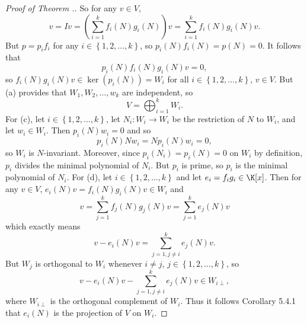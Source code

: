 \documentclass[linearalgebraII]{subfiles}
\begin{document}
\begin{proof}[Proof of Theorem \thechapter.\thestcounter]
        So for any $v\in V$,
        \begin{equation*}
            v = Iv = \left( \sum^{k}_{i=1} f_i(N)g_i(N) \right) v = \sum^{k}_{i=1} f_i(N)g_i(N)v.
        \end{equation*}
        But $p = p_if_i$ for any $i\in\left\lbrace 1,2,\ldots,k \right\rbrace$, so $p_i(N)f_i(N) = p(N) = 0$. It follows that
        \begin{equation*}
            p_i(N)f_i(N)g_i(N)v = 0,
        \end{equation*}
        so $f_i(N)g_i(N)v\in\ker\left( p_i(N) \right) = W_i$ for all $i\in\left\lbrace 1,2,\ldots,k \right\rbrace$, $v\in V$. But (a) provides that $W_1,W_2,\ldots,w_k$ are independent, so
        \begin{equation*}
            V = \bigoplus^{k}_{i=1} W_i.
        \end{equation*}
        For (c), let $i\in\left\lbrace 1,2,\ldots,k \right\rbrace$, let $N_i:W_i\to W_i$ be the restriction of $N$ to $W_i$, and let $w_i\in W_i$. Then $p_i(N)w_i = 0$ and so
        \begin{equation*}
            p_i(N)Nw_i = Np_i(N)w_i = 0,
        \end{equation*}
        so $W_i$ is $N$-invariant. Moreover, since $p_i\left( N_i \right) = p_i(N) = 0$ on $W_i$ by definition, $p_i$ divides the minimal polynomial of $N_i$. But $p_i$ is prime, so $p_i$ is the minimal polynomial of $N_i$. For (d), let $i\in\left\lbrace 1,2,\ldots,k \right\rbrace$ and let $e_i=f_ig_i\in\K[x]$. Then for any $v\in V$, $e_i(N)v = f_i(N)g_i(N)v \in W_i$ and
        \begin{equation*}
            v = \sum^{k}_{j=1} f_j(N)g_j(N) v = \sum^{k}_{j=1} e_j(N)v
        \end{equation*}
        which exactly means
        \begin{equation*}
            v - e_i(N)v = \sum^{k}_{j=1,j\neq i} e_j(N)v.
        \end{equation*}
        But $W_j$ is orthogonal to $W_i$ whenever $i\neq j$, $j\in\left\lbrace 1,2,\ldots,k \right\rbrace$, so
        \begin{equation*}
            v-e_i(N)v - \sum^{k}_{j=1,j\neq i} e_j(N)v\in W_{i\perp},
        \end{equation*}
        where $W_{i\perp}$ is the orthogonal complement of $W_i$. Thus it follows Corollary 5.4.1 that $e_i(N)$ is the projection of $V$ on $W_i$.
    \end{proof}
\end{document}
